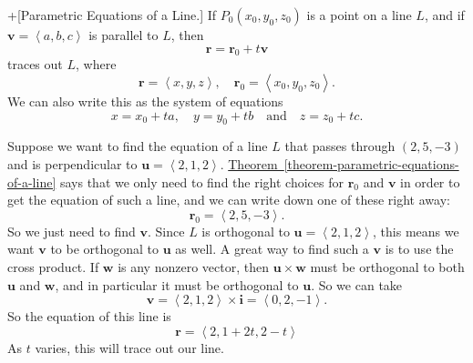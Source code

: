 \documentclass[10pt,]{book}
\theoremstyle{ptxplainnotitle}
\theoremstyle{ptxplaintitle}
\theoremstyle{ptxplainnotitle}
\theoremstyle{ptxplaintitle}
\theoremstyle{ptxplainnotitle}
\theoremstyle{ptxplaintitle}
\theoremstyle{ptxdefinitionnotitle}
\theoremstyle{ptxdefinitiontitle}
\theoremstyle{ptxdefinitionnotitle}
\theoremstyle{ptxdefinitiontitle}
\theoremstyle{ptxdefinitionnotitle}
\theoremstyle{ptxdefinitiontitle}
\theoremstyle{ptxdefinitionnotitle}
\theoremstyle{ptxdefinitiontitle}
\theoremstyle{ptxdefinitionnotitle}
\theoremstyle{ptxdefinitiontitle}
\numberwithin{equation}{section}
\newcommand{\RR}{\mathbb{R}}
\newcommand{\vv}[1]{\mathbf{#1}}
\newcommand{\dotprod}[1]{\left\langle #1 \right\rangle}
\begin{document}
\begin{theorem}+[{Parametric Equations of a Line.}]\label{theorem-parametric-equations-of-a-line}
\index{lines!parametric equations in \(\RR^{3}\)}\hypertarget{p-862}{}%
If \(P_{0}(x_{0},y_{0},z_{0})\) is a point on a line \(L\), and if \(\vv{v} = \dotprod{a,b,c}\) is parallel to \(L\), then%
%
\begin{equation*}
\vv{r} = \vv{r}_{0}+t\vv{v}
\end{equation*}
\hypertarget{p-863}{}%
traces out \(L\), where%
%
\begin{equation*}
\vv{r} = \dotprod{x,y,z},\quad\vv{r}_{0} = \dotprod{x_{0},y_{0},z_{0}}.
\end{equation*}
\hypertarget{p-864}{}%
We can also write this as the system of equations%
%
\begin{equation*}
x = x_{0}+ta,\quad y=y_{0}+tb\quad\text{and}\quad z = z_{0}+tc.
\end{equation*}
\end{theorem}
\begin{example}\label{example-equation-of-a-line-with-a-given-direction-and-point}
\hypertarget{p-865}{}%
Suppose we want to find the equation of a line \(L\) that passes through \((2,5,-3)\) and is perpendicular to \(\vv{u} = \dotprod{2,1,2}\). \hyperref[theorem-parametric-equations-of-a-line]{Theorem~\ref{theorem-parametric-equations-of-a-line}} says that we only need to find the right choices for \(\vv{r}_{0}\) and \(\vv{v}\) in order to get the equation of such a line, and we can write down one of these right away:%
%
\begin{equation*}
\vv{r}_{0} = \dotprod{2,5,-3}.
\end{equation*}
\hypertarget{p-866}{}%
So we just need to find \(\vv{v}\). Since \(L\) is orthogonal to \(\vv{u} = \dotprod{2,1,2}\), this means we want \(\vv{v}\) to be orthogonal to \(\vv{u}\) as well. A great way to find such a \(\vv{v}\) is to use the cross product. If \(\vv{w}\) is any nonzero vector, then \(\vv{u}\times\vv{w}\) must be orthogonal to both \(\vv{u}\) and \(\vv{w}\), and in particular it must be orthogonal to \(\vv{u}\). So we can take%
%
\begin{equation*}
\vv{v} = \dotprod{2,1,2}\times\vv{i} = \dotprod{0,2,-1}.
\end{equation*}
\hypertarget{p-867}{}%
So the equation of this line is%
%
\begin{equation*}
\vv{r} = \dotprod{2,1+2t,2-t}
\end{equation*}
\hypertarget{p-868}{}%
As \(t\) varies, this will trace out our line.%
\end{example}
\end{document}
